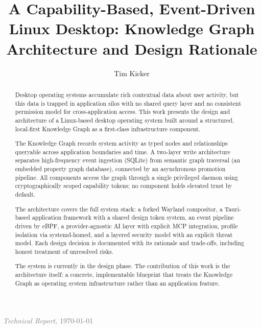 \documentclass[english,submission]{programming}
\title{A Capability-Based, Event-Driven Linux Desktop: Knowledge Graph Architecture and Design Rationale}
\author{Tim Kicker}
\affiliation{University of Innsbruck, Innsbruck, Austria \textbar{}
  \href{https://orcid.org/0009-0009-4026-8646}{\small ORCID: 0009-0009-4026-8646}}
\begin{document}
\maketitle

\vspace{0.5\baselineskip}
{\small\noindent\textcolor{gray}{\textit{Technical Report,} \today}}

\begin{abstract}
Desktop operating systems accumulate rich contextual data about user activity,
but this data is trapped in application silos with no shared query layer and no
consistent permission model for cross-application access. This work presents
the design and architecture of a Linux-based desktop operating system built
around a structured, local-first Knowledge Graph as a first-class
infrastructure component.

The Knowledge Graph records system activity as typed nodes and relationships
queryable across application boundaries and time. A two-layer write
architecture separates high-frequency event ingestion (SQLite) from semantic
graph traversal (an embedded property graph database), connected by an
asynchronous promotion pipeline. All components access the graph through a
single privileged daemon using cryptographically scoped capability tokens; no
component holds elevated trust by default.

The architecture covers the full system stack: a forked Wayland compositor, a
Tauri-based application framework with a shared design token system, an event
pipeline driven by eBPF, a provider-agnostic AI layer with explicit MCP
integration, profile isolation via systemd-homed, and a layered security model
with an explicit threat model. Each design decision is documented with its
rationale and trade-offs, including honest treatment of unresolved risks.

The system is currently in the design phase. The contribution of this work is
the architecture itself: a concrete, implementable blueprint that treats the
Knowledge Graph as operating system infrastructure rather than an application
feature.
\end{abstract}

\tableofcontents












\clearpage

\printbibliography
\end{document}

